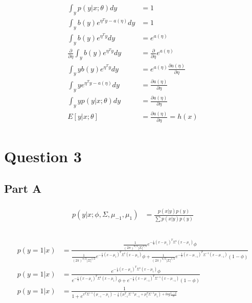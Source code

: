 \documentclass[11pt]{article}
\begin{document}
\begin{align}
	\begin{split}
			        \int_{y}p(y|x;\theta)dy &= 1 \\
    \int_{y}b(y)e^{\eta^Ty-a(\eta)}dy &= 1 \\
						\int_{y}b(y)e^{\eta^Ty}dy &= e^{a(\eta)} \\
		\frac{\partial}{\partial \eta} \int_{y}b(y)e^{\eta^Ty}dy &= \frac{\partial}{\partial \eta}e^{a(\eta)} \\
		\int_{y}yb(y)e^{\eta^Ty}dy &= e^{a(\eta)}\frac{\partial a(\eta)}{\partial \eta} \\
		\int_{y}ye^{\eta^Ty-a(\eta)}dy &= \frac{\partial a(\eta)}{\partial \eta} \\
		\int_{y}yp(y|x;\theta)dy &= \frac{\partial a(\eta)}{\partial \eta} \\
		E[y|x;\theta] &= \frac{\partial a(\eta)}{\partial \eta} = h(x)
  \end{split}
\end{align}


\section*{Question 3}
\subsection*{Part A}
\begin{align}
	\begin{split}
		p(y|x; \phi, \Sigma, \mu_{-1}, \mu_{1}) &= \frac{p(x|y)p(y)}{\sum p(x|y)p(y)} \\
	\end{split}
\end{align}

\begin{align}
	\begin{split}
    p(y=1|x) &= \frac{\frac{1}{(2\pi)^{n/2}|\Sigma|^{1/2}}e^{-\frac{1}{2}(x-\mu_{1})^T\Sigma^{1}(x-\mu_{1})}\phi}
                     {\frac{1}{(2\pi)^{n/2}|\Sigma|^{1/2}}e^{-\frac{1}{2}(x-\mu_{1})^T\Sigma^{1}(x-\mu_{1})}\phi +
											\frac{1}{(2\pi)^{n/2}|\Sigma|^{1/2}}e^{-\frac{1}{2}(x-\mu_{-1})^T\Sigma^{-1}(x-\mu_{-1})}(1-\phi)} \\ 
		p(y=1|x) &= \frac{e^{-\frac{1}{2}(x-\mu_{1})^T\Sigma^{1}(x-\mu_{1})}\phi}
                     {e^{-\frac{1}{2}(x-\mu_{1})^T\Sigma^{1}(x-\mu_{1})}\phi +
											e^{-\frac{1}{2}(x-\mu_{-1})^T\Sigma^{-1}(x-\mu_{-1})}(1-\phi)} \\
		p(y=1|x) &= \frac{1}{1 + e^{ x^T\Sigma^{-1}(\mu_{-1}-\mu_{1}) - 
								\frac{1}{2}(\mu_{-1}^T\Sigma^{-1}\mu_{-1} + \mu_{1}^T\Sigma^{-1}\mu_{1}) + 
								log\frac{1-\phi}{\phi}}} \\
	\end{split}
\end{align}
\end{document}
